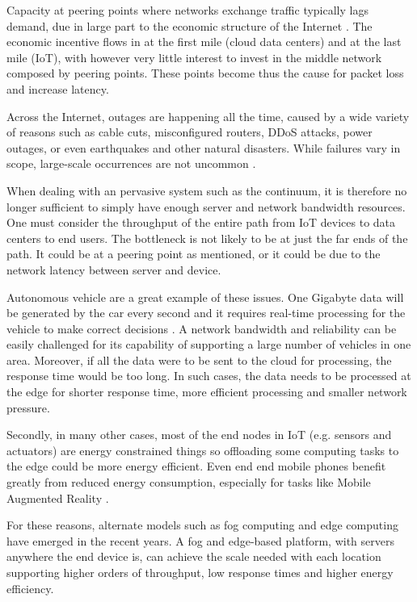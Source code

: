 \documentclass{ieeeaccess}
\begin{document}
Capacity at peering points where networks exchange traffic typically lags demand, due in large part to the economic structure of the Internet \cite{akamai}. The economic incentive flows in at the first mile (cloud data centers) and at the last mile (IoT), with however very little interest to invest in the middle network composed by peering points. These points become thus the cause for packet loss and increase latency.

Across the Internet, outages are happening all the time, caused by a wide variety of reasons such as cable cuts, misconfigured routers, DDoS attacks, power outages, or even earthquakes and other natural disasters. While failures vary in scope, large-scale occurrences are not uncommon \cite{aws-outage}.

When dealing with an pervasive system such as the continuum, it is therefore no longer sufficient to simply have enough server and network bandwidth resources. One must consider the throughput of the entire path from IoT devices to data centers to end users. The bottleneck is not likely to be at just the far ends of the path. It could be at a peering point as mentioned, or it could be due to the network latency between server and device. 

Autonomous vehicle are a great example of these issues. One Gigabyte data will be generated by the car every second and it requires real-time processing for the vehicle to make correct decisions \cite{edge-computing-vision-challenges}. A network bandwidth and reliability can be easily challenged for its capability of supporting a large number of vehicles in one area. Moreover, if all the data were to be sent to the cloud for processing, the response time would be too long. In such cases, the data needs to be processed at the edge for shorter response time, more efficient processing and smaller network pressure.

Secondly, in many other cases, most of the end nodes in IoT (e.g. sensors and actuators) are energy constrained things so offloading some computing tasks to the edge could be more energy efficient. Even end end mobile phones benefit greatly from reduced energy consumption, especially for tasks like Mobile Augmented Reality \cite{mobile-augmented-reality}.

For these reasons, alternate models such as fog computing and edge computing have emerged in the recent years. A fog and edge-based platform, with servers anywhere the end device is, can achieve the scale needed with each location supporting higher orders of throughput, low response times and higher energy efficiency.
\end{document}
